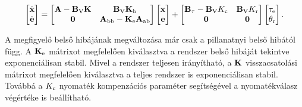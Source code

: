 \begin{align}
    \begin{bmatrix}
        \dot{\mathbf{x}} \\
        \dot{\mathbf{e}}
    \end{bmatrix}
    =
    \begin{bmatrix}
        \mathbf{A} - \mathbf{B}_{\mathrm{V}} \mathbf{K} & \mathbf{B}_{\mathrm{V}} \mathbf{K}_{\mathrm{b}} \\
        \mathbf{0} & \mathbf{A}_{\mathrm{bb}} - \mathbf{K}_{\mathrm{e}} \mathbf{A}_{\mathrm{ab}}
    \end{bmatrix}
    \begin{bmatrix}
        \mathbf{x} \\
        \mathbf{e}
    \end{bmatrix}
    +
    \begin{bmatrix}
        \mathbf{B}_{\mathrm{\tau}} - \mathbf{B}_{\mathrm{V}} K_{\mathrm{c}} & \mathbf{B}_{\mathrm{V}} K_{\mathrm{r}}\\
        \mathbf{0} & \mathbf{0}
    \end{bmatrix}
    \begin{bmatrix}
        \tau_{\mathrm{e}} \\
        \theta_{\mathrm{r}}
    \end{bmatrix}.
\end{align}

A megfigyelő belső hibájának megváltozása már csak a pillanatnyi belső hibától függ. A \(\mathbf{K}_{\mathrm{e}}\) mátrixot 
megfelelően kiválasztva a rendszer belső hibáját tekintve exponenciálisan stabil. Mivel a rendszer teljesen irányítható,
a \(\mathbf{K}\) visszacsatolási mátrixot megfelelően kiválasztva a teljes rendszer is exponenciálisan stabil. Továbbá 
a \(K_{\mathrm{c}}\) nyomaték kompenzációs paraméter segítségével a nyomatékválasz végértéke is beállítható.

